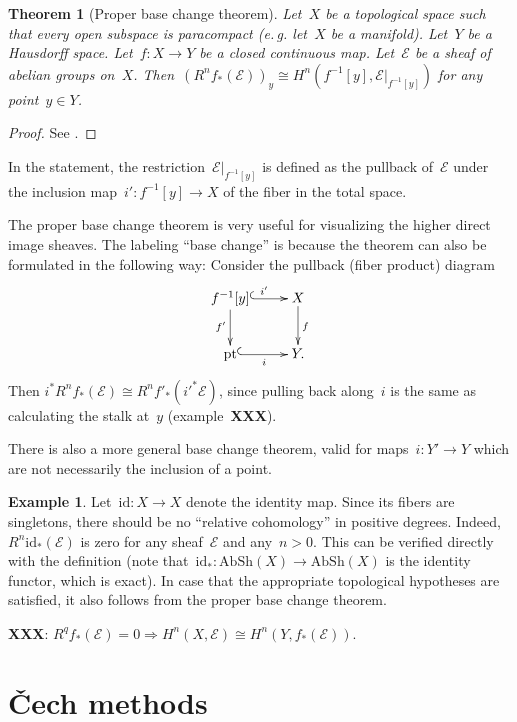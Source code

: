 \documentclass[10pt]{amsart}
\makeatletter
\theoremstyle{definition}
\newtheorem{ex}[defn]{Example}
\theoremstyle{plain}
\newtheorem{thm}[defn]{Theorem}
\theoremstyle{remark}
\newcommand{\E}{\mathcal{E}}
\newcommand{\AbSh}{\mathrm{AbSh}}
\newcommand{\eg}{e.\,g.\@\xspace}
\newcommand{\pt}{\mathrm{pt}}
\newcommand{\id}{\mathrm{id}}
\makeatother
\begin{document}
\begin{thm}[Proper base change theorem]Let~$X$ be a topological space such
that every open subspace is paracompact (\eg let~$X$ be a manifold). Let~$Y$ be
a Hausdorff space. Let~$f : X \to Y$ be a closed continuous map. Let~$\E$ be a
sheaf of abelian groups on~$X$. Then~$(R^n f_*(\E))_y \cong H^n(f^{-1}[y],
\E|_{f^{-1}[y]})$ for any point~$y \in Y$.\end{thm}

\begin{proof}See \cite[Thm.~8.11]{wedhorn}.\end{proof}

In the statement, the restriction~$\E|_{f^{-1}[y]}$ is defined as the pullback
of~$\E$ under the inclusion map~$i' : f^{-1}[y] \to X$ of the fiber in the
total space.

The proper base change theorem is very useful for visualizing the higher direct
image sheaves. The labeling ``base change'' is because the theorem can also be
formulated in the following way: Consider the pullback (fiber product) diagram
\[ \xymatrix{
  f^{-1}[y] \ar@{^{(}->}[r]^{i'} \ar[d]_{f'} & X \ar[d]^f \\
  \pt \ar@{^{(}->}[r]_i & Y.
} \]
Then $i^* R^n f_*(\E) \cong R^n f'_*(i'^*\E)$, since pulling back along~$i$ is
the same as calculating the stalk at~$y$ (example~\textbf{XXX}).

There is also a more general base change theorem, valid for maps~$i : Y' \to Y$
which are not necessarily the inclusion of a point.

\begin{ex}Let~$\id : X \to X$ denote the identity map. Since its fibers are
singletons, there should be no ``relative cohomology'' in positive degrees.
Indeed,~$R^n \id_*(\E)$ is zero for any sheaf~$\E$ and any~$n > 0$. This can be
verified directly with the definition (note that~$\id_* : \AbSh(X) \to
\AbSh(X)$ is the identity functor, which is exact). In case that the appropriate
topological hypotheses are satisfied, it also follows from the proper base
change theorem.\end{ex}

\textbf{XXX}: $R^q f_*(\E) = 0 \Rightarrow H^n(X,\E) \cong H^n(Y,f_*(\E))$.


\section{Čech methods}
\end{document}
